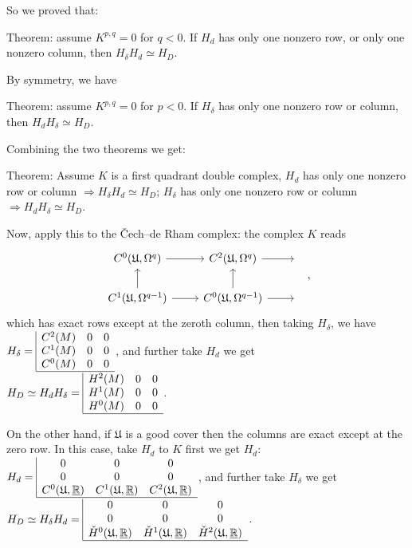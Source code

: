 \documentclass{article}
\theoremstyle{mystyle}
\theoremstyle{remark}
\numberwithin{equation}{section}
\begin{document}
So we proved that:

Theorem: assume $K^{p,q}=0$ for $q<0$. If $H_d$ has only one nonzero row, or only one nonzero column, then $H_\delta H_d \simeq H_D$. 

By symmetry, we have

Theorem: assume $K^{p,q}=0$ for $p<0$. If $H_\delta$ has only one nonzero row or column, then $H_dH_\delta \simeq H_D$.

Combining the two theorems we get:

Theorem: Assume $K$ is a first quadrant double complex, $H_d$ has only one nonzero row or column $\Rightarrow H_\delta H_d \simeq H_D$; $H_\delta$ has only one nonzero row or column $\Rightarrow H_dH_\delta \simeq H_D$. 


Now, apply this to the Čech--de Rham complex: the complex $K$ reads
$$
\begin{tikzcd}
C^0(\mathfrak{U},\Omega^q)\ar[r] & C^2(\mathfrak{U},\Omega^q)\ar[r] &~\\ 
C^1(\mathfrak{U},\Omega^{q-1})\ar[r]\ar[u] & C^0(\mathfrak{U},\Omega^{q-1})\ar[r]\ar[u] &~
\end{tikzcd},
$$
which has exact rows except at the zeroth column, then taking $H_\delta$, we have
$
H_\delta = \begin{array}{|ccc} C^2(M) &0&0\\ 
C^1(M)&0&0\\C^0(M)&0&0\\
\hline
\end{array}
$, 
and further take $H_d$ we get
$
H_D\simeq H_dH_\delta = 
\begin{array}{|ccc}H^2(M) &0&0\\ 
H^1(M)&0&0\\H^0(M)&0&0\\
\hline
\end{array}
$.

On the other hand, if $\mathfrak{U}$ is a good cover then the columns are exact except at the zero row. In this case, take $H_d$ to $K$ first we get $H_d$:
$
H_d = \begin{array}{|ccc}
0&0&0\\0&0&0\\
C^0(\mathfrak{U},\underline{\mathbb{R}})&C^1(\mathfrak{U},\underline{\mathbb{R}})&C^2(\mathfrak{U},\underline{\mathbb{R}})\\
\hline
\end{array}
$, 
and further take $H_\delta$ we get
$
H_D\simeq H_\delta H_d =   
\begin{array}{|ccc}
0&0&0\\0&0&0\\
\check{H}^0(\mathfrak{U},\underline{\mathbb{R}})&\check{H}^1(\mathfrak{U},\underline{\mathbb{R}})&\check{H}^2(\mathfrak{U},\underline{\mathbb{R}})\\
\hline
\end{array}$.
\end{document}
